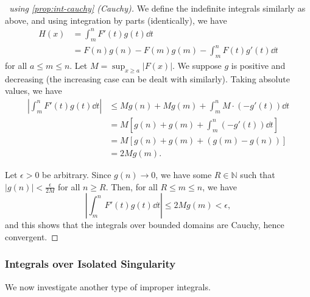 \documentclass[11pt]{article}
\numberwithin{equation}{section}
\theoremstyle{definition}
\theoremstyle{remark}
\newcommand{\pqty}[1]{\left(#1\right)}
\newcommand{\bqty}[1]{\left[#1\right]}
\newcommand{\abs}[1]{\left|#1\right|}
\newcommand{\NN}{\mathbb N}
\begin{document}
\begin{proof}[\proofname\ using \autoref{prop:int-cauchy} (Cauchy)]
    We define the indefinite integrals similarly as above, and using integration by parts (identically), we have
    \begin{align*}
        H\pqty{x} &= \int_{m}^{n} F'\pqty{t} g\pqty{t} \dd{t} \\
        &= F\pqty{n} g\pqty{n} - F\pqty{m} g\pqty{m} - \int_{m}^{n} F\pqty{t} g'\pqty{t} \dd{t}
    \end{align*}
    for all \(a \leq m \leq n\). Let \(M = \sup_{x \geq a} \abs{F\pqty{x}}\). We suppose \(g\) is positive and decreasing (the increasing case can be dealt with similarly). Taking absolute values, we have
    \begin{align*}
        \abs{\int_{m}^{n} F'\pqty{t} g\pqty{t} \dd{t}} &\leq M g\pqty{n} + M g\pqty{m} + \int_{m}^{n} M \cdot \pqty{- g'\pqty{t}} \dd{t} \\
        &= M \bqty{g\pqty{n} + g\pqty{m} + \int_{m}^{n} \pqty{- g'\pqty{t}} \dd{t}} \\
        &= M \bqty{g\pqty{n} + g\pqty{m} + \pqty{g\pqty{m} - g\pqty{n}}} \\
        &= 2 M g\pqty{m}.
    \end{align*}

    Let \(\epsilon > 0\) be arbitrary. Since \(g\pqty{n} \to 0\), we have some \(R \in \NN\) such that \(\abs{g\pqty{n}} < \frac{\epsilon}{2M}\) for all \(n \geq R\). Then, for all \(R \leq m \leq n\), we have
    \[
        \abs{\int_{m}^{n} F'\pqty{t} g\pqty{t} \dd{t}} \leq 2M g\pqty{m} < \epsilon,
    \]
    and this shows that the integrals over bounded domains are Cauchy, hence convergent.
\end{proof}

\subsubsection{Integrals over Isolated Singularity}

We now investigate another type of improper integrals.
\end{document}
